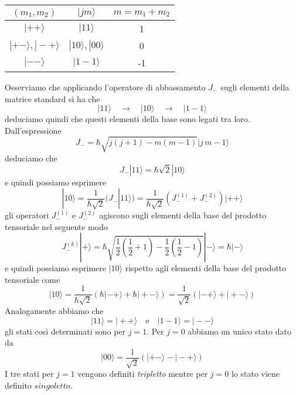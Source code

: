 \begin{center}
\vspace{0.5cm} 
\begin{tabular}{c|cc}
\hline
$(m_1,m_2)$ & $|jm \rangle $ & $m = m_1 + m_2$ \\ \hline
$|++\rangle $ & $|11\rangle$ & 1 \\ 
$|+-\rangle, |-+\rangle$ & $|10\rangle,|00 \rangle$ & 0 \\ 
$|-- \rangle$ & $|1-1\rangle$ & -1
\end{tabular}
\vspace{0.5cm}
\end{center}
Osserviamo che applicando l'operatore di abbassamento $J_-$ sugli elementi della matrice standard si ha che 
\begin{equation*}
	|11 \rangle \quad \to \quad |10 \rangle \quad \to \quad |1-1 \rangle 
\end{equation*}
deduciamo quindi che questi elementi della base sono legati tra loro. Dall'espressione
\begin{equation*}
	J_- = \hbar \sqrt{j(j+1)-m(m-1)}|j\,m-1\rangle
\end{equation*}
deduciamo che 
\begin{equation*}
	J_- |11 \rangle = \hbar \sqrt{2} |10 \rangle
\end{equation*}
e quindi possiamo esprimere 
\begin{equation*}
	|10 \rangle = \frac{1}{\hbar \sqrt{2}}(J_-|11\rangle) = \frac{1}{\hbar \sqrt{2}}(J_-^{(1)} + J_-^{(2)})|++\rangle 
\end{equation*}
gli operatori $J_-^{(1)}$ e $J_-^{(2)}$ agiscono sugli elementi della base del prodotto tensoriale nel seguente modo
\begin{equation*}
	J_-^{(k)} |+ \rangle = \hbar \sqrt{\frac{1}{2} \left(\frac{1}{2}+1 \right) - \frac{1}{2} \left( \frac{1}{2}-1 \right)}|- \rangle = \hbar|-\rangle
\end{equation*}
e quindi possiamo esprimere $|10 \rangle$ rispetto agli elementi della base del prodotto tensoriale come
\newpage
\begin{equation*}
|10 \rangle = \frac{1}{\hbar \sqrt{2}}(\hbar|-+\rangle + \hbar |+-\rangle) = \frac{1}{\sqrt{2}}(|-+ \rangle + |+- \rangle)
\end{equation*}
Analogamente abbiamo che 
\begin{equation*}
	|11 \rangle = |++ \rangle \quad \text{e} \quad |1-1\rangle =|--\rangle
\end{equation*}
gli stati cos\`i determinati sono per $j=1$. Per $j=0$ abbiamo un unico stato dato da 
\begin{equation*}
	|00 \rangle = \frac{1}{\sqrt{2}}(|+- \rangle - |- +\rangle)
\end{equation*}
I tre stati per $j=1$ vengono definiti \textit{tripletto} mentre per $j=0$ lo stato viene definito $singoletto$.

